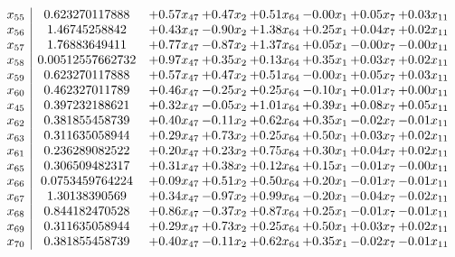 \documentclass[8pt]{article}
\begin{document}
\[\begin{array}{c| c c@{\hskip 2pt} c@{\hskip 2pt} c@{\hskip 2pt} c@{\hskip 2pt} c@{\hskip 2pt} c@{\hskip 2pt} }
 x_{55}   &  0.623270117888 & +  0.57 x_{47} & +  0.47 x_{2} & +  0.51 x_{64} & -0.00 x_{1} & +  0.05 x_{7} & +  0.03 x_{11}\\
 x_{56}   &  1.46745258842 & +  0.43 x_{47} & -0.90 x_{2} & +  1.38 x_{64} & +  0.25 x_{1} & +  0.04 x_{7} & +  0.02 x_{11}\\
 x_{57}   &  1.76883649411 & +  0.77 x_{47} & -0.87 x_{2} & +  1.37 x_{64} & +  0.05 x_{1} & -0.00 x_{7} & -0.00 x_{11}\\
 x_{58}   &  0.00512557662732 & +  0.97 x_{47} & +  0.35 x_{2} & +  0.13 x_{64} & +  0.35 x_{1} & +  0.03 x_{7} & +  0.02 x_{11}\\
 x_{59}   &  0.623270117888 & +  0.57 x_{47} & +  0.47 x_{2} & +  0.51 x_{64} & -0.00 x_{1} & +  0.05 x_{7} & +  0.03 x_{11}\\
 x_{60}   &  0.462327011789 & +  0.46 x_{47} & -0.25 x_{2} & +  0.25 x_{64} & -0.10 x_{1} & +  0.01 x_{7} & +  0.00 x_{11}\\
 x_{45}   &  0.397232188621 & +  0.32 x_{47} & -0.05 x_{2} & +  1.01 x_{64} & +  0.39 x_{1} & +  0.08 x_{7} & +  0.05 x_{11}\\
 x_{62}   &  0.381855458739 & +  0.40 x_{47} & -0.11 x_{2} & +  0.62 x_{64} & +  0.35 x_{1} & -0.02 x_{7} & -0.01 x_{11}\\
 x_{63}   &  0.311635058944 & +  0.29 x_{47} & +  0.73 x_{2} & +  0.25 x_{64} & +  0.50 x_{1} & +  0.03 x_{7} & +  0.02 x_{11}\\
 x_{61}   &  0.236289082522 & +  0.20 x_{47} & +  0.23 x_{2} & +  0.75 x_{64} & +  0.30 x_{1} & +  0.04 x_{7} & +  0.02 x_{11}\\
 x_{65}   &  0.306509482317 & +  0.31 x_{47} & +  0.38 x_{2} & +  0.12 x_{64} & +  0.15 x_{1} & -0.01 x_{7} & -0.00 x_{11}\\
 x_{66}   &  0.0753459764224 & +  0.09 x_{47} & +  0.51 x_{2} & +  0.50 x_{64} & +  0.20 x_{1} & -0.01 x_{7} & -0.01 x_{11}\\
 x_{67}   &  1.30138390569 & +  0.34 x_{47} & -0.97 x_{2} & +  0.99 x_{64} & -0.20 x_{1} & -0.04 x_{7} & -0.02 x_{11}\\
 x_{68}   &  0.844182470528 & +  0.86 x_{47} & -0.37 x_{2} & +  0.87 x_{64} & +  0.25 x_{1} & -0.01 x_{7} & -0.01 x_{11}\\
 x_{69}   &  0.311635058944 & +  0.29 x_{47} & +  0.73 x_{2} & +  0.25 x_{64} & +  0.50 x_{1} & +  0.03 x_{7} & +  0.02 x_{11}\\
 x_{70}   &  0.381855458739 & +  0.40 x_{47} & -0.11 x_{2} & +  0.62 x_{64} & +  0.35 x_{1} & -0.02 x_{7} & -0.01 x_{11}\\

\end{array}\]
\end{document}
